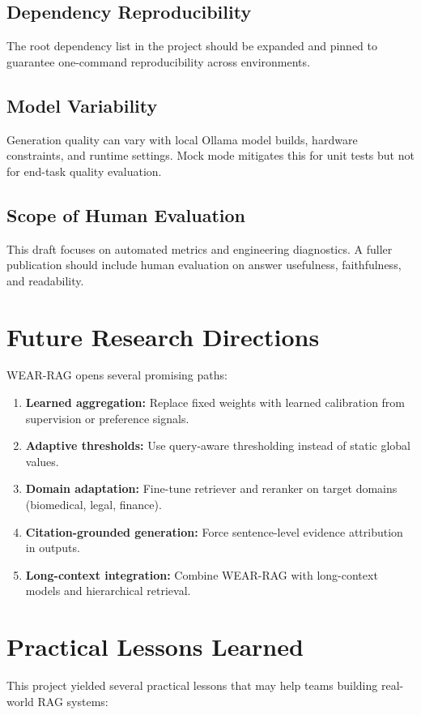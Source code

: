 \documentclass[10pt,draftclsnofoot,onecolumn,journal]{IEEEtran}
\begin{document}
\subsection{Dependency Reproducibility}
The root dependency list in the project should be expanded and pinned to guarantee one-command reproducibility across environments.

\subsection{Model Variability}
Generation quality can vary with local Ollama model builds, hardware constraints, and runtime settings. Mock mode mitigates this for unit tests but not for end-task quality evaluation.

\subsection{Scope of Human Evaluation}
This draft focuses on automated metrics and engineering diagnostics. A fuller publication should include human evaluation on answer usefulness, faithfulness, and readability.

\section{Future Research Directions}
WEAR-RAG opens several promising paths:
\begin{enumerate}
\item \textbf{Learned aggregation:} Replace fixed weights with learned calibration from supervision or preference signals.
\item \textbf{Adaptive thresholds:} Use query-aware thresholding instead of static global values.
\item \textbf{Domain adaptation:} Fine-tune retriever and reranker on target domains (biomedical, legal, finance).
\item \textbf{Citation-grounded generation:} Force sentence-level evidence attribution in outputs.
\item \textbf{Long-context integration:} Combine WEAR-RAG with long-context models and hierarchical retrieval.
\end{enumerate}

\section{Practical Lessons Learned}
This project yielded several practical lessons that may help teams building real-world RAG systems:
\end{document}
